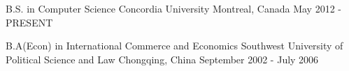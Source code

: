 


\begin{cventries}


\cventry
{B.S. in Computer Science} %
{Concordia University} %
{Montreal, Canada} %
{May 2012 - PRESENT} %
{ %
}



\end{cventries}

\begin{cventries}
	
	
\cventry
{B.A(Econ) in International Commerce and Economics} %
{Southwest University of Political Science and Law} %
{Chongqing, China} %
{September 2002 - July 2006 } %
{
	}


\end{cventries}